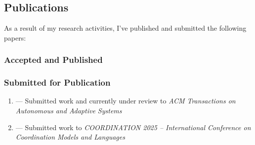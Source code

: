 \documentclass[runningheads]{llncs}
\begin{document}
\subsection{Publications}
\label{sec:publications}

As a result of my research activities,
I've published and submitted the following papers:

\subsubsection{Accepted and Published}
\begin{refsection}
    \nocite{*} %
    \printbibliography[heading=none]
\end{refsection}

\subsubsection{Submitted for Publication}
\begin{enumerate}
    \item {} --- Submitted work and currently under review to \emph{ACM Transactions on Autonomous and Adaptive Systems} 
    \item {} --- Submitted work to \emph{COORDINATION 2025 -- International Conference on Coordination Models and Languages}
\end{enumerate}

\end{document}
